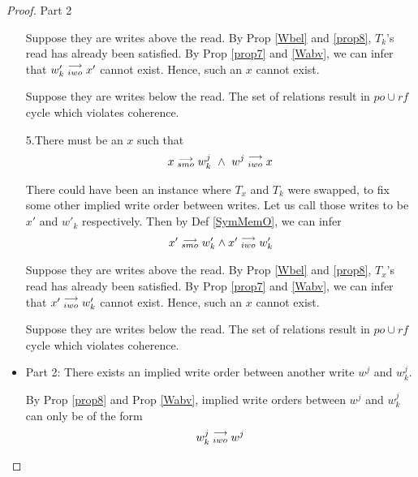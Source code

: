 \begin{proof}{Part 2}
\begin{itemize}
                        Suppose they are writes above the read.                         
                        By Prop \ref{Wbel} and \ref{prop8}, $T_k$'s read has already been satisfied. By Prop \ref{prop7} and \ref{Wabv}, we can infer that $w'_k\stackrel{\longrightarrow}{_{iwo}}x'$ cannot exist. Hence, such an $x$ cannot exist. 
                        
                        Suppose they are writes below the read.
                        The set of relations result in $po \cup rf$ cycle which violates coherence.  

                        5.There must be an $x$ such that 
                        \begin{align*}
                            \reln{x}{smo}{w_k^j} \ \wedge \ \reln{w^j}{iwo}{x}
                        \end{align*}

                        There could have been an instance where $T_x$ and $T_k$ were swapped, to fix some other implied write order between writes. 
                        Let us call those writes to be $x'$ and $w'_k$ respectively.
                        Then by Def \ref{SymMemO}, we can infer 
                        \begin{align*}
                            x'\stackrel{\longrightarrow}{_{smo}}w'_k \wedge x'\stackrel{\longrightarrow}{_{iwo}}w'_k
                        \end{align*}
                        
                        Suppose they are writes above the read.                         
                        By Prop \ref{Wbel} and \ref{prop8}, $T_x$'s read has already been satisfied. By Prop \ref{prop7} and \ref{Wabv}, we can infer that $x'\stackrel{\longrightarrow}{_{iwo}}w'_k$ cannot exist. Hence, such an $x$ cannot exist. 
                        
                        Suppose they are writes below the read.
                        The set of relations result in $po \cup rf$ cycle which violates coherence.

                    \item Part 2: There exists an implied write order between another write $w^j$ and $w_k^j$.
                        
                        By Prop \ref{prop8} and Prop \ref{Wabv}, implied write orders between $w^j$ and $w_k^j$ can only be of the form 
                        \begin{align*}
                            w_k^j\stackrel{\longrightarrow}{_{iwo}}w^j
                        \end{align*}
                        

\end{itemize}
\end{proof}
